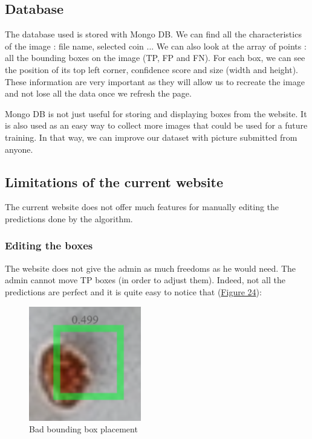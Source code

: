 \documentclass{article}
\begin{document}
\subsection{Database}

The database used is stored with Mongo DB. We can find all the characteristics of the image : file name, selected coin ... We can also look at the array of points : all the bounding boxes on the image (TP, FP and FN). For each box, we can see the position of its top left corner, confidence score and size (width and height). These information are very important as they will allow us to recreate the image and not lose all the data once we refresh the page.

\bigskip

Mongo DB is not just useful for storing and displaying boxes from the website. It is also used as an easy way to collect more images that could be used for a future training. In that way, we can improve our dataset with picture submitted from anyone.

\subsection{Limitations of the current website}

The current website does not offer much features for manually editing the predictions done by the algorithm.

\subsubsection{Editing the boxes}

The website does not give the admin as much freedoms as he would need. The admin cannot move TP boxes (in order to adjust them). Indeed, not all the predictions are perfect and it is quite easy to notice that (\hyperref[Figure 24]{Figure 24}): 

\begin{figure}[!ht]
  \centering
  \includegraphics[scale=0.9]{limitation/misplaced.PNG}
  \caption{Bad bounding box placement}
  \label{Figure 24}
\end{figure}
\end{document}
